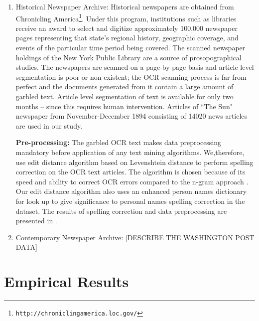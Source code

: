 \documentclass[a4paper,man,natbib]{apa6}
\begin{document}
\begin{enumerate}
\item Historical Newspaper Archive: Historical newspapers are obtained from Chronicling America\footnote{\texttt{http://chroniclingamerica.loc.gov/}}. Under this program, institutions such as libraries receive an award to select and digitize approximately 100,000 newspaper pages representing that state's regional history, geographic coverage, and events of the particular time period being covered. The scanned newspaper holdings of the New York Public Library are a source of prosopographical studies. The newspapers are scanned on a page-by-page basis and article level
segmentation is poor or non-existent; the OCR scanning process is far
from perfect and the documents generated from it contain a large
amount of garbled text. Article level segmentation of text is available for only two months -- since this requires human intervention. Articles of ``The Sun" newspaper from November-December 1894 consisting of 14020 news articles are used in our study. 

\textbf{Pre-processing: } The garbled OCR text makes data preprocessing mandatory before application of any text mining algorithms. We,therefore, use edit distance algorithm based on Levenshtein distance to perform spelling correction on the OCR text articles. The algorithm is chosen because of its speed and ability to correct OCR errors compared to the n-gram approach \cite{chattopadhyaya2013fast}. Our edit distance algorithm also uses an enhanced person names dictionary for look up to give significance to personal names spelling correction in the dataset. The results of spelling correction and data preprocessing are presented in \cite{Gupta_14a}.


\item Contemporary Newspaper Archive: [DESCRIBE THE WASHINGTON POST DATA]
\end{enumerate}




\section{Empirical Results}
\label{emp}
\end{document}
